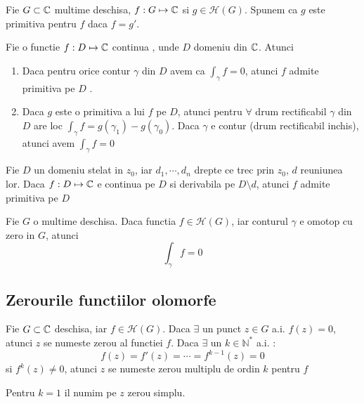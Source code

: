 \begin{definition}
    Fie $G\subset \mathbb{C}$ multime deschisa, $f:G\mapsto \mathbb{C}$ si $g \in \mathcal{H}(G)$. Spunem ca $g$
    este primitiva pentru $f$ daca $f = g'$.
\end{definition}

\begin{theorem}
    Fie o functie $f:D\mapsto \mathbb{C}$ continua , unde $D$ domeniu din $\mathbb{C}$. Atunci
    \begin{enumerate}
        \item Daca pentru orice contur $\gamma$ din $D$ avem ca $\displaystyle \int_{\gamma} f = 0$, atunci $f$
            admite primitiva pe $D$ .
        \item Daca $g$ este o primitiva a lui $f$ pe $D$, atunci pentru $\forall$ drum rectificabil
            $\gamma$ din $D$ are loc $\displaystyle \int_{\gamma} f = g(\gamma_1) - g(\gamma_0)$. Daca $\gamma$
            e contur (drum rectificabil inchis), atunci avem $\displaystyle \int_{\gamma} f = 0$
    \end{enumerate}
\end{theorem}

\begin{theorem}
    Fie $D$ un domeniu stelat in $z_0$, iar $d_1, \cdots , d_n$ drepte ce trec prin $z_0$,
    $d$ reuniunea lor. Daca $f:D\mapsto \mathbb{C}$ e continua pe $D$ si derivabila pe $D\setminus d$,
    atunci $f$ admite primitiva pe $D$
\end{theorem}

\begin{theorem}[Cauchy]
    Fie $G$ o multime deschisa. Daca functia $f\in\mathcal{H}(G)$, iar conturul $\gamma$ e omotop cu zero
     in $G$, atunci
     \[
        \int_{\gamma} f = 0
     \]
\end{theorem}

\clearpage
\subsection{Zerourile functiilor olomorfe}

\begin{definition}
    Fie $G\subset \mathbb{C}$ deschisa, iar $f \in \mathcal{H}(G)$. Daca $\exists$ un punct $z\in G$ a.i.
    $f(z) = 0$, atunci $z$ se numeste zerou al functiei $f$. Daca $\exists$ un $k\in\mathbb{N}^{*}$
    a.i. :
    \[
        f(z) = f'(z) = \cdots = f^{k-1}(z) = 0
    \]
    si $f^{k}(z) \neq 0$, atunci $z$ se numeste zerou multiplu de ordin $k$ pentru $f$

    Pentru $k=1$ il numim pe $z$ zerou simplu.
\end{definition}

